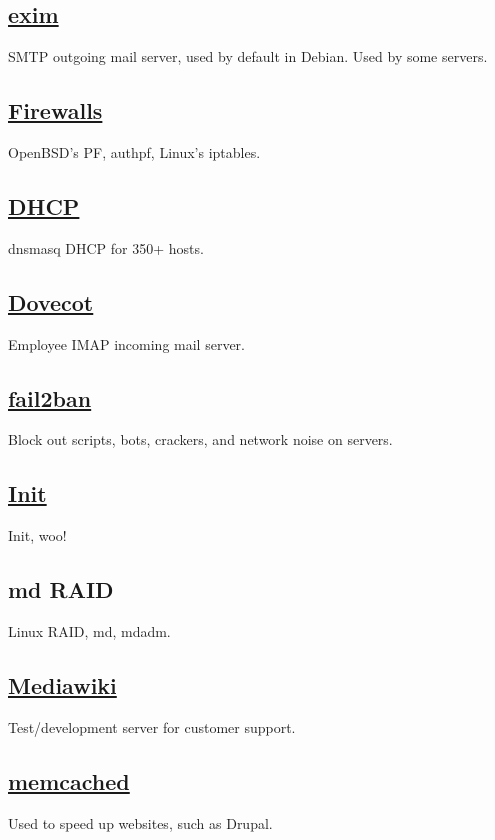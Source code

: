 \subsection{\href{http://www.exim.org/}{exim}}
SMTP outgoing mail server, used by default in Debian. Used by some servers.

\subsection{\href{http://www.openbsd.org/faq/pf/}{Firewalls}}
OpenBSD's PF, authpf, Linux's iptables.

\subsection{\href{http://dnsmasq.org/}{DHCP}}
dnsmasq DHCP for 350+ hosts.

\subsection{\href{http://dovecot.org/}{Dovecot}}
Employee IMAP incoming mail server.

\subsection{\href{http://www.fail2ban.org/}{fail2ban}}
Block out scripts, bots, crackers, and network noise on servers.

\subsection{\href{http://www.debian.org/}{Init}}
Init, woo!

\subsection{md RAID}
Linux RAID, md, mdadm.

\subsection{\href{http://www.mediawiki.org/}{Mediawiki}}
Test/development server for customer support.

\subsection{\href{http://www.memcached.org/}{memcached}}
Used to speed up websites, such as Drupal.


